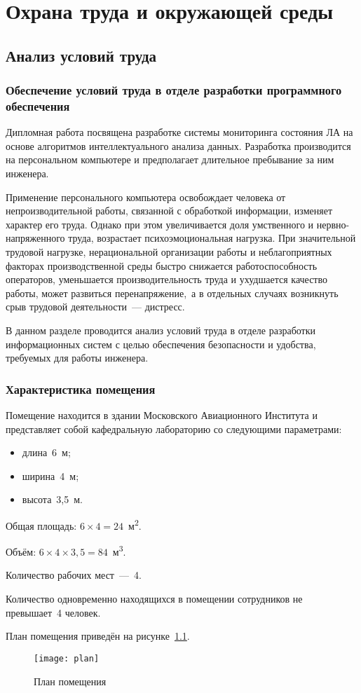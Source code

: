 \chapter{Охрана труда и окружающей среды}
\section{Анализ условий труда}
\subsection{Обеспечение условий труда в отделе разработки программного обеспечения}
Дипломная работа посвящена разработке системы мониторинга состояния ЛА на основе алгоритмов интеллектуального анализа данных. Разработка производится на персональном компьютере и предполагает длительное пребывание за ним инженера.

Применение персонального компьютера освобождает человека от непроизводительной работы, связанной с обработкой информации, изменяет характер его труда. Однако при этом увеличивается доля умственного и нервно-напряженного труда, возрастает психоэмоциональная нагрузка. При значительной трудовой нагрузке, нерациональной организации работы и неблагоприятных факторах производственной среды быстро снижается работоспособность операторов, уменьшается производительность труда и ухудшается качество работы, может развиться перенапряжение,~а в отдельных случаях возникнуть срыв трудовой деятельности~— дистресс.

В данном разделе проводится анализ условий труда в отделе разработки информационных систем с целью обеспечения безопасности и удобства, требуемых для работы инженера.

\subsection{Характеристика помещения}
Помещение находится в здании Московского Авиационного Института и представляет собой кафедральную лабораторию со следующими параметрами:
\begin{itemize}
\item длина~6~м;
\item ширина~4~м;
\item высота~3,5~м.
\end{itemize}

Общая площадь: $6\times4 = 24$~м\textsuperscript{2}.

Объём: $6\times4\times3,5 = 84$~м\textsuperscript{3}.

Количество рабочих мест~—~4.

Количество одновременно находящихся в помещении сотрудников не превышает~4 человек.

План помещения приведён на рисунке~\ref{image:room_plan}.
\begin{figure}[h]
\texttt{[image: plan]}
\caption{План помещения}\label{image:room_plan}
\end{figure}